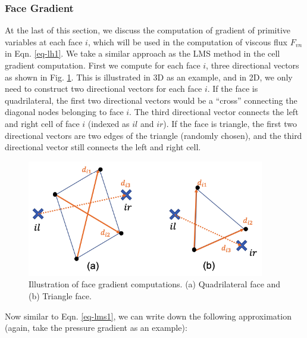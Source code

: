 \documentclass[12pt, letterpaper]{report}
\begin{document}
\subsubsection{Face Gradient}

At the last of this section, we discuss the computation of gradient of primitive variables at each
face $i$, which will be used in the computation of viscous flux $F_{vn}$ in Eqn. \ref{eq-lh1}. We
take a similar approach as the LMS method in the cell gradient computation. First we compute for
each face $i$, three directional vectors as shown in Fig. \ref{fig-alg3}. This is illustrated in 3D
as an example, and in 2D, we only need to construct two directional vectors for each face $i$. If
the face is quadrilateral, the first two directional vectors would be a ``cross'' connecting the
diagonal nodes belonging to face $i$. The third directional vector connects the left and right cell
of face $i$ (indexed as $il$ and $ir$). If the face is triangle, the first two directional vectors
are two edges of the triangle (randomly chosen), and the third directional vector still connects the
left and right cell.

\begin{figure}[H]
   \centering
   \includegraphics[height=2in]{Algorithm3.png}
   \caption{Illustration of face gradient computations. (a) Quadrilateral face and (b) Triangle
   face.}
   \label{fig-alg3}
\end{figure}

Now similar to Eqn. \ref{eq-lms1}, we can write down the following approximation (again, take the
pressure gradient as an example):
\end{document}
